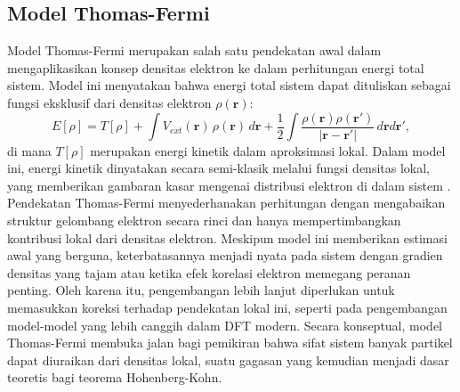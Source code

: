 \subsection{Model Thomas-Fermi}
Model Thomas-Fermi merupakan salah satu pendekatan awal dalam mengaplikasikan konsep densitas elektron ke dalam perhitungan energi total sistem.
Model ini menyatakan bahwa energi total sistem dapat dituliskan sebagai fungsi eksklusif dari densitas elektron \(\rho(\mathbf{r})\):
\begin{equation}
    E[\rho] = T[\rho] + \int V_{ext}(\mathbf{r})\,\rho(\mathbf{r})\,d\mathbf{r} + \frac{1}{2}\int \frac{\rho(\mathbf{r})\rho(\mathbf{r'})}{|\mathbf{r}-\mathbf{r'}|}\, d\mathbf{r}d\mathbf{r'},
\end{equation}
di mana \(T[\rho]\) merupakan energi kinetik dalam aproksimasi lokal.
Dalam model ini, energi kinetik dinyatakan secara semi-klasik melalui fungsi densitas lokal, yang memberikan gambaran kasar mengenai distribusi elektron di dalam sistem \cite{Martin2004}.
Pendekatan Thomas-Fermi menyederhanakan perhitungan dengan mengabaikan struktur gelombang elektron secara rinci dan hanya mempertimbangkan kontribusi lokal dari densitas elektron.
Meskipun model ini memberikan estimasi awal yang berguna, keterbatasannya menjadi nyata pada sistem dengan gradien densitas yang tajam atau ketika efek korelasi elektron memegang peranan penting.
Oleh karena itu, pengembangan lebih lanjut diperlukan untuk memasukkan koreksi terhadap pendekatan lokal ini, seperti pada pengembangan model-model yang lebih canggih dalam DFT modern.
Secara konseptual, model Thomas-Fermi membuka jalan bagi pemikiran bahwa sifat sistem banyak partikel dapat diuraikan dari densitas lokal, suatu gagasan yang kemudian menjadi dasar teoretis bagi teorema Hohenberg-Kohn.

